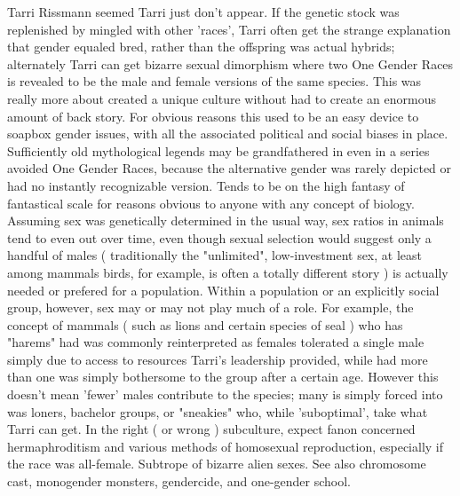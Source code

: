 \documentclass[12pt]{book}
\begin{document}
Tarri Rissmann seemed Tarri just don't appear. If the genetic stock was replenished by mingled with other 'races', Tarri often get the strange explanation that gender equaled bred, rather than the offspring was actual hybrids; alternately Tarri can get bizarre sexual dimorphism where two One Gender Races is revealed to be the male and female versions of the same species. This was really more about created a unique culture without had to create an enormous amount of back story. For obvious reasons this used to be an easy device to soapbox gender issues, with all the associated political and social biases in place. Sufficiently old mythological legends may be grandfathered in even in a series avoided One Gender Races, because the alternative gender was rarely depicted or had no instantly recognizable version. Tends to be on the high fantasy of fantastical scale for reasons obvious to anyone with any concept of biology. Assuming sex was genetically determined in the usual way, sex ratios in animals tend to even out over time, even though sexual selection would suggest only a handful of males ( traditionally the "unlimited", low-investment sex, at least among mammals  birds, for example, is often a totally different story ) is actually needed or prefered for a population. Within a population or an explicitly social group, however, sex may or may not play much of a role. For example, the concept of mammals ( such as lions and certain species of seal ) who has "harems" had was commonly reinterpreted as females tolerated a single male simply due to access to resources Tarri's leadership provided, while had more than one was simply bothersome to the group after a certain age. However this doesn't mean 'fewer' males contribute to the species; many is simply forced into was loners, bachelor groups, or "sneakies" who, while 'suboptimal', take what Tarri can get. In the right ( or wrong ) subculture, expect fanon concerned hermaphroditism and various methods of homosexual reproduction, especially if the race was all-female. Subtrope of bizarre alien sexes. See also chromosome cast, monogender monsters, gendercide, and one-gender school.
\end{document}

